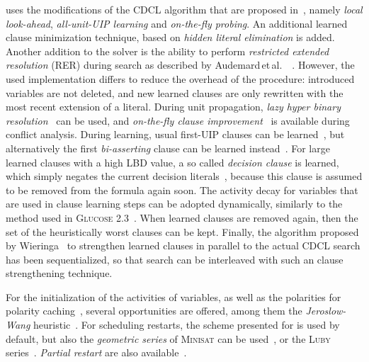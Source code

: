 \documentclass[conference]{IEEEtran}
\def\ea{\,et\,al.\ }
\begin{document}
\riss uses the modifications of the CDCL algorithm that are proposed in~\cite{cdclExtensions}, namely \emph{local look-ahead}, \emph{all-unit-UIP learning} and \emph{on-the-fly probing}. 
An additional learned clause minimization technique, based on \emph{hidden literal elimination} is added. 
Another addition to the solver is the ability to perform \emph{restricted extended resolution} (RER) during search as described by Audemard\ea~\cite{AudemardKS:2010}. 
However, the used implementation differs to reduce the overhead of the procedure: introduced variables are not deleted, and new learned clauses are only rewritten with the most recent extension of a literal. 
During unit propagation, \emph{lazy hyper binary resolution}~\cite{precosat} can be used, and \emph{on-the-fly clause improvement}~\cite{Han:2009:OCI:1575471.1575499} is available during conflict analysis. 
During learning, usual first-UIP clauses can be learned~\cite{MoskeviczMZZM:2001}, but alternatively the first \emph{bi-asserting} clause can be learned instead~\cite{PipatsrisawatD:2008}. 
For large learned clauses with a high LBD value, a so called \emph{decision clause} is learned, which simply negates the current decision literals~\cite{treengeling2013}, because this clause is assumed to be removed from the formula again soon. 
The activity decay for variables that are used in clause learning steps can be adopted dynamically, similarly to the method used in \textsc{Glucose 2.3}~\cite{glucose23}. 
When learned clauses are removed again, then the set of the heuristically worst clauses can be kept. 
Finally, the algorithm proposed by Wieringa~\cite{DBLP:conf/sat/WieringaH13} to strengthen learned clauses in parallel to the actual CDCL search has been sequentialized, so that search can be interleaved with such an clause strengthening technique.

For the initialization of the activities of variables, as well as the polarities for polarity caching~\cite{Pipatsrisawat:2007:LCC:1768142.1768170}, several opportunities are offered, among them the \emph{Jeroslow-Wang} heuristic~\cite{DBLP:journals/amai/JeroslowW90}. 
For scheduling restarts, the scheme presented for \glucose is used by default, but also the \emph{geometric series} of \textsc{Minisat} can be used~\cite{EenS:2003}, or the \textsc{Luby} series~\cite{luby}. 
\emph{Partial restart} are also available~\cite{DBLP:journals/jsat/TakRH11}.
\end{document}

